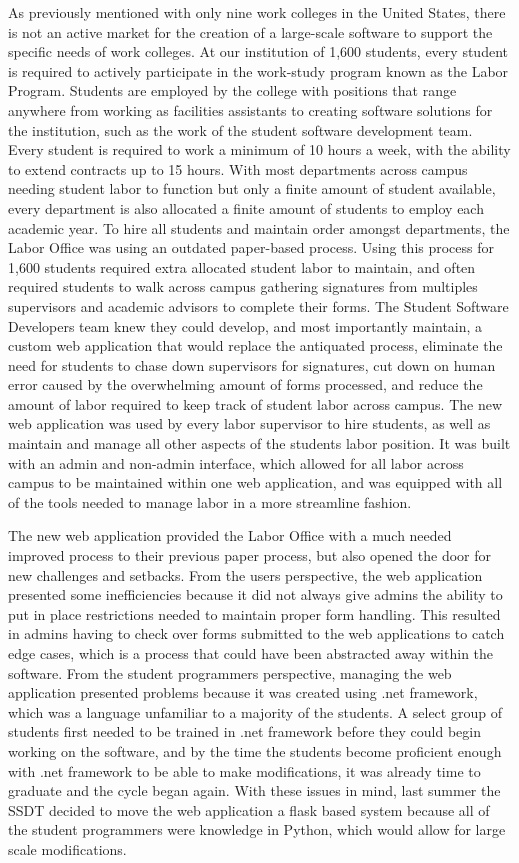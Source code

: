 As previously mentioned with only nine work colleges in the United States, there is not an active market for the creation of a large-scale software to support the specific needs of work colleges. At our institution of 1,600 students, every student is required to actively participate in the work-study program known as the Labor Program. Students are employed by the college with positions that range anywhere from working as facilities assistants to creating software solutions for the institution, such as the work of the student software development team. Every student is required to work a minimum of 10 hours a week, with the ability to extend contracts up to 15 hours. With most departments across campus needing student labor to function but only a finite amount of student available, every department is also allocated a finite amount of students to employ each academic year. To hire all students and maintain order amongst departments, the Labor Office was using an outdated paper-based process. Using this process for 1,600 students required extra allocated student labor to maintain, and often required students to walk across campus gathering signatures from multiples supervisors and academic advisors to complete their forms. The Student Software Developers team knew they could develop, and most importantly maintain, a custom web application that would replace the antiquated process, eliminate the need for students to chase down supervisors for signatures, cut down on human error caused by the overwhelming amount of forms processed, and reduce the amount of labor required to keep track of student labor across campus. The new web application was used by every labor supervisor to hire students, as well as maintain and manage all other aspects of the students labor position. It was built with an admin and non-admin interface, which allowed for all labor across campus to be maintained within one web application, and was equipped with all of the tools needed to manage labor in a more streamline fashion.

The new web application provided the Labor Office with a much needed improved process to their previous paper process, but also opened the door for new challenges and setbacks. From the users perspective, the web application presented some inefficiencies because it did not always give admins the ability to put in place restrictions needed to maintain proper form handling. This resulted in admins having to check over forms submitted to the web applications to catch edge cases, which is a process that could have been abstracted away within the software. From the student programmers perspective, managing the web application presented problems because it was created using .net framework, which was a language unfamiliar to a majority of the students. A select group of students first needed to be trained in .net framework before they could begin working on the software, and by the time the students become proficient enough with .net framework to be able to make modifications, it was already time to graduate and the cycle began again. With these issues in mind, last summer the SSDT decided to move the web application a flask based system because all of the student programmers were knowledge in Python, which would allow for large scale modifications.

